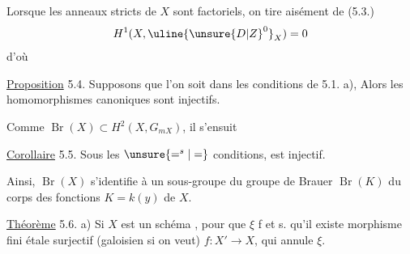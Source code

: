 
Lorsque   les anneaux  stricts de $X$ sont factoriels, on tire aisément de (5.3.)
\[
H^1(X,\uline{\unsure{D|Z}^0}_X)=0
\]
d'où 

\uline{Proposition} 5.4. Supposons que l'on soit dans les conditions de 5.1. a),  Alors les homomorphismes canoniques
sont injectifs.

Comme $\operatorname{Br}(X)\subset H^2(X,G_{mX})$, il s'ensuit

\uline{Corollaire} 5.5. Sous les $\unsure{=^{s}|=}$ conditions,
est injectif.

Ainsi, $\operatorname{Br}(X)$ s'identifie  à un sous-groupe du groupe de Brauer $\operatorname{Br}(K)$ du corps des fonctions $K=k(y)$ de $X$.

\uline{Théorème} 5.6. 
a) Si $X$ est un schéma ,   pour que $\xi$   f et s. qu'il existe   morphisme fini étale surjectif (galoisien si on veut) $f:X'\longrightarrow X$,  qui  annule $\xi$.

